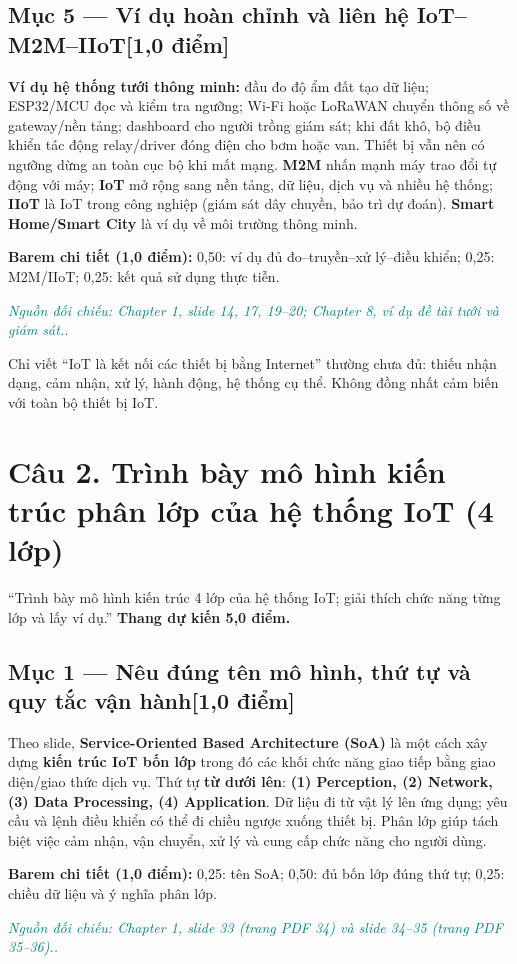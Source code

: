 \documentclass[11pt,a4paper]{article}
\newcommand{\pointpart}[2]{\subsection*{Mục #1 --- #2\hfill\normalsize\color{teal}[1,0 điểm]}}
\newcommand{\src}[1]{\par\noindent\textcolor{teal}{\footnotesize\textit{Nguồn đối chiếu: #1.}}\par}
\newcommand{\scoring}[1]{\par\noindent\textbf{Barem chi tiết (1,0 điểm):} #1\par}
\newcommand{\kw}[1]{\textbf{#1}}
\begin{document}
\pointpart{5}{Ví dụ hoàn chỉnh và liên hệ IoT--M2M--IIoT}
\kw{Ví dụ hệ thống tưới thông minh:} đầu đo độ ẩm đất tạo dữ liệu; ESP32/MCU đọc và kiểm tra ngưỡng; Wi-Fi hoặc LoRaWAN chuyển thông số về gateway/nền tảng; dashboard cho người trồng giám sát; khi đất khô, bộ điều khiển tác động relay/driver đóng điện cho bơm hoặc van. Thiết bị vẫn nên có ngưỡng dừng an toàn cục bộ khi mất mạng. \kw{M2M} nhấn mạnh máy trao đổi tự động với máy; \kw{IoT} mở rộng sang nền tảng, dữ liệu, dịch vụ và nhiều hệ thống; \kw{IIoT} là IoT trong công nghiệp (giám sát dây chuyền, bảo trì dự đoán). \kw{Smart Home/Smart City} là ví dụ về môi trường thông minh.
\scoring{0,50: ví dụ đủ đo--truyền--xử lý--điều khiển; 0,25: M2M/IIoT; 0,25: kết quả sử dụng thực tiễn.}
\src{Chapter 1, slide 14, 17, 19--20; Chapter 8, ví dụ đề tài tưới và giám sát.}
\begin{warningbox}Chỉ viết ``IoT là kết nối các thiết bị bằng Internet'' thường chưa đủ: thiếu nhận dạng, cảm nhận, xử lý, hành động, hệ thống cụ thể. Không đồng nhất cảm biến với toàn bộ thiết bị IoT.\end{warningbox}

\clearpage
\section{Câu 2. Trình bày mô hình kiến trúc phân lớp của hệ thống IoT (4 lớp)}
\begin{questionbox}
``Trình bày mô hình kiến trúc 4 lớp của hệ thống IoT; giải thích chức năng từng lớp và lấy ví dụ.'' \textbf{Thang dự kiến 5,0 điểm.}
\end{questionbox}
\pointpart{1}{Nêu đúng tên mô hình, thứ tự và quy tắc vận hành}
Theo slide, \kw{Service-Oriented Based Architecture (SoA)} là một cách xây dựng \kw{kiến trúc IoT bốn lớp} trong đó các khối chức năng giao tiếp bằng giao diện/giao thức dịch vụ. Thứ tự \kw{từ dưới lên}: \kw{(1) Perception, (2) Network, (3) Data Processing, (4) Application}. Dữ liệu đi từ vật lý lên ứng dụng; yêu cầu và lệnh điều khiển có thể đi chiều ngược xuống thiết bị. Phân lớp giúp tách biệt việc cảm nhận, vận chuyển, xử lý và cung cấp chức năng cho người dùng.

\begin{center}\end{center}
\scoring{0,25: tên SoA; 0,50: đủ bốn lớp đúng thứ tự; 0,25: chiều dữ liệu và ý nghĩa phân lớp.}
\src{Chapter 1, slide 33 (trang PDF 34) và slide 34--35 (trang PDF 35--36).}
\end{document}
